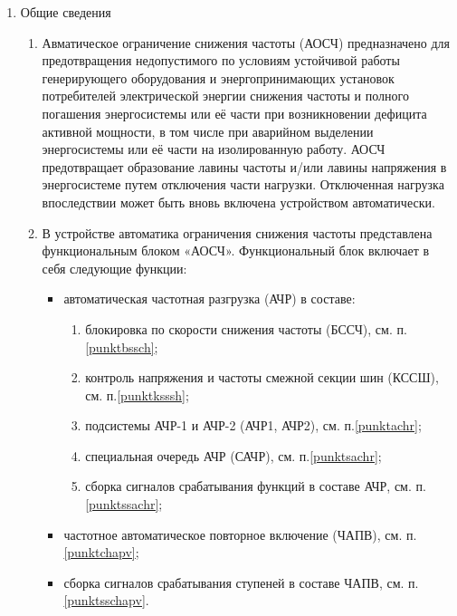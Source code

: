 
\color{black}

\begin{enumerate}

\item Общие сведения

\begin{enumerate}

\item
Авматическое ограничение снижения частоты (АОСЧ) предназначено для предотвращения недопустимого по условиям устойчивой работы генерирующего оборудования и энергопринимающих установок потребителей электрической энергии снижения частоты и полного погашения энергосистемы или её части при возникновении дефицита активной мощности, в том числе при аварийном выделении энергосистемы или её части на изолированную работу. АОСЧ предотвращает образование лавины частоты и/или лавины напряжения в энергосистеме путем отключения части нагрузки. Отключенная нагрузка впоследствии может быть вновь включена устройством автоматически.

 \item
В устройстве автоматика ограничения снижения частоты представлена функциональным блоком «АОСЧ». Функциональный блок включает в себя следующие функции:
\begin{itemize}
    \item автоматическая частотная разгрузка (АЧР) в составе:
    \begin{enumerate}[label=\arabic*)]  
    \item блокировка по скорости снижения частоты (БССЧ), см. п.\ref{punktbssch};
    \item контроль напряжения и частоты смежной секции шин (КССШ), см. п.\ref{punktksssh};
    \item подсистемы АЧР-1 и АЧР-2 (АЧР1, АЧР2), см. п.\ref{punktachr};
    \item специальная очередь АЧР (САЧР), см. п.\ref{punktsachr};
    \item сборка сигналов срабатывания функций в составе АЧР, см. п.\ref{punktssachr};
    \end{enumerate} 
    \item частотное автоматическое повторное включение (ЧАПВ), см. п.\ref{punktchapv};
    \item сборка сигналов срабатывания ступеней в составе ЧАПВ, см. п.\ref{punktsschapv}.   
\end{itemize}


\end{enumerate}
\end{enumerate}
